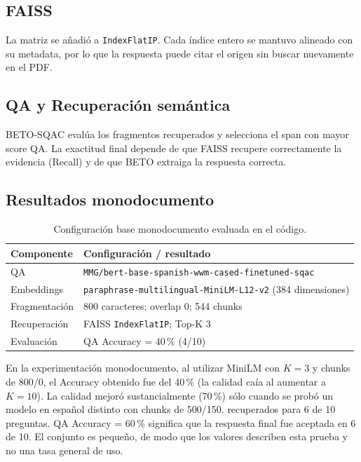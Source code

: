 \documentclass[12pt,letterpaper]{article}
\begin{document}
\subsection{FAISS}

La matriz se añadió a \texttt{IndexFlatIP}. Cada índice entero se mantuvo
alineado con su metadata, por lo que la respuesta puede citar el origen sin
buscar nuevamente en el PDF.

\subsection{QA y Recuperación semántica}

BETO-SQAC evalúa los fragmentos recuperados y selecciona el span con mayor
score QA. La exactitud final depende de que FAISS recupere correctamente 
la evidencia (Recall) y de que BETO extraiga la respuesta correcta.

\subsection{Resultados monodocumento}

\begin{table}[!htbp]
\centering
\small
\caption{Configuración base monodocumento evaluada en el código.}
\label{tab:config-final}
\begin{tabularx}{\linewidth}{@{}lY@{}}
\toprule
\textbf{Componente} & \textbf{Configuración / resultado}\\
\midrule
QA & \texttt{MMG/bert-base-spanish-wwm-cased-finetuned-sqac}\\
Embeddings & \texttt{paraphrase-multilingual-MiniLM-L12-v2} (384 dimensiones)\\
Fragmentación & 800 caracteres; overlap 0; 544 chunks\\
Recuperación & FAISS \texttt{IndexFlatIP}; Top-K 3\\
Evaluación & QA Accuracy = 40\,\% (4/10)\\
\bottomrule
\end{tabularx}
\end{table}

En la experimentación monodocumento, al utilizar MiniLM con $K=3$ y chunks 
de 800/0, el Accuracy obtenido fue del 40\,\% (la calidad caía al aumentar a $K=10$). 
La calidad mejoró sustancialmente (70\,\%) sólo cuando se probó un modelo en 
español distinto con chunks de 500/150.
recuperados para 6 de 10 preguntas. QA Accuracy = 60\,\% significa que la
respuesta final fue aceptada en 6 de 10. El conjunto es pequeño, de modo que
los valores describen esta prueba y no una tasa general de uso.
\end{document}
